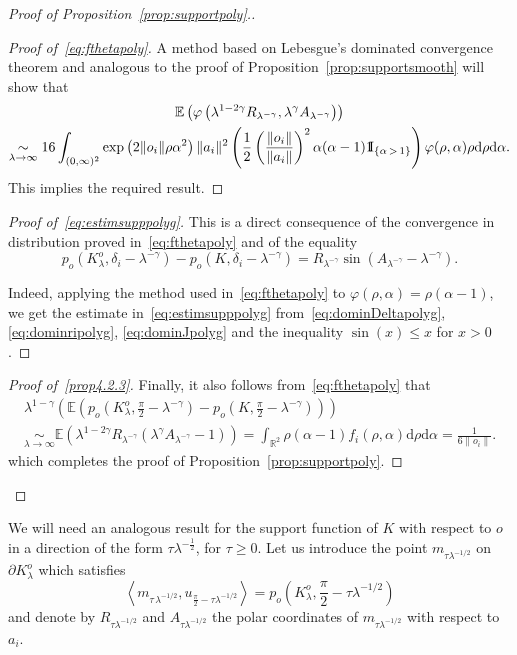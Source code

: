 \documentclass[10pt]{amsart}
\theoremstyle{definition}\newtheorem{defi}[theo]{Definition}\newtheorem{rema}[theo]{Remark}\newtheorem{exam}[theo]{Example}\newtheorem{exem}[theo]{Example}\newtheorem{nota}[theo]{Notation}
\newcommand{\indicat}{{\text{1}}\negthickspace\text{I}}
\newcommand{\dd}{\mathrm{d}}
\newcommand{\E}{\mathbb{E}}
\newcommand{\R}{\mathbb{R}}
\newcommand{\pass}{\vspace{0.3cm}\noindent}
\newcommand{\noi}{\noindent}
\newenvironment*{prooff}{\begin{proof}}{\let\qed\relax\end{proof}}
\newenvironment*{lastprooff}{\begin{proof}}{\end{proof}}
\begin{document}
\begin{proof}[{Proof of Proposition~\ref{prop:supportpoly}.}]
\begin{prooff}[{Proof of~\eqref{eq:fthetapoly}}]
A method based on Lebesgue's dominated convergence theorem and analogous to the proof of Proposition~\ref{prop:supportsmooth} will show that
\begin{multline*}
\E\left(\varphi\left(\lambda^{1-2\gamma}R_{\lambda^{-\gamma}}, \lambda^{\gamma}A_{\lambda^{-\gamma}}\right)\right)\\
\underset{\lambda\to\infty}{\sim} 16\int_{(0,\infty)^2}\exp\left(2\|o_i\|\rho\alpha^2\right)\|a_i\|^2\left(\frac1{2}\left(\frac{\|o_i\|}{\|a_i\|}\right)^2\alpha(\alpha-1)\indicat_{\left\{\alpha\,>\,1\right\}}\right)
\varphi(\rho,\alpha)\rho\dd \rho \dd\alpha.
\end{multline*}
This implies the required result.
\end{prooff}

\begin{prooff}[{Proof of~\eqref{eq:estimsupppolyg}}]
This is a direct consequence of the convergence in distribution proved in~\eqref{eq:fthetapoly} and of the equality
\[
p_o\left(K_{\lambda}^o,\delta_i -\lambda^{-\gamma}\right)-p_o\left(K,\delta_i-\lambda^{-\gamma}\right)=R_{\lambda^{-\gamma}}\sin\left(A_{\lambda^{-\gamma}}-\lambda^{-\gamma}\right).
\]

Indeed, applying the method used in~\eqref{eq:fthetapoly} to $\varphi(\rho,\alpha)=\rho(\alpha-1)$, we get the estimate in~\eqref{eq:estimsupppolyg} from~\eqref{eq:dominDeltapolyg}, \eqref{eq:dominripolyg}, \eqref{eq:dominJpolyg} and the inequality $\sin(x)\le x$ for $x>0$.
\end{prooff}

\begin{lastprooff}[{Proof of~\eqref{prop4.2.3}}]
Finally, it also follows from~\eqref{eq:fthetapoly} that
\begin{multline*}
\lambda^{1-\gamma}\left(\E\left(p_o\left(K_{\lambda}^o,\frac{\pi}{2} -\lambda^{-\gamma}\right)-p_o\left(K,\frac{\pi}{2}-\lambda^{-\gamma}\right)\right)\right)\\
\underset{\lambda\to\infty}{\sim} \E\left(\lambda^{1-2\gamma}R_{\lambda^{-\gamma}}\left(\lambda^{\gamma}A_{\lambda^{-\gamma}}-1\right)\right) 
= \int_{\R^2} \rho(\alpha-1) f_i(\rho,\alpha)\dd \rho\dd \alpha = \frac1{6\|o_i\|}.
\end{multline*}
which completes the proof of Proposition~\ref{prop:supportpoly}.
\end{lastprooff}\let\qed\relax
\end{proof}
We will need an analogous result for the support function of $K$ with respect to $o$ in a direction of the form $\tau\lambda^{-\frac1{2}}$, for $\tau\ge0$. Let us introduce the point $m_{\tau\lambda^{-1/2}}$ on $\partial K_{\lambda}^o$ which satisfies
\[
\left\langle m_{\tau\,\lambda^{-1/2}}, u_{\frac{\pi}{2}-\tau\lambda^{-1/2}}\right\rangle=p_o\left(K_{\lambda}^o,\frac{\pi}{2}-\tau\lambda^{-1/2}\right)
\]
and denote by $R_{\tau\lambda^{-1/2}}$ and $A_{\tau\lambda^{-1/2}}$ the polar coordinates of $m_{\tau\lambda^{-1/2}}$ with respect to $a_i$.
\end{document}
